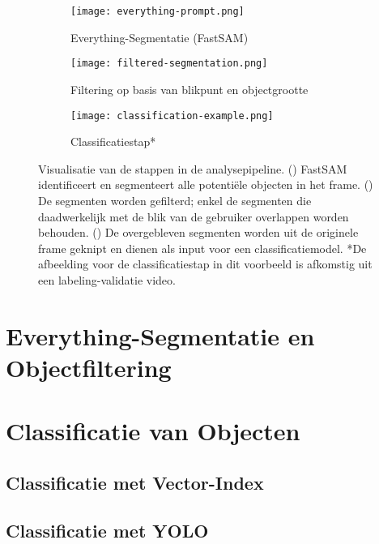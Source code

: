 \begin{figure}[H]
    \centering
        \begin{subfigure}[b]{0.75\textwidth}
        \centering
        \texttt{[image: everything-prompt.png]}
        \caption{Everything-Segmentatie (FastSAM)}
        \label{fig:pipeline_stap_a}
    \end{subfigure}

    \vspace{0.5cm}

    \begin{subfigure}[b]{0.75\textwidth}
    \centering
    \texttt{[image: filtered-segmentation.png]}
    \caption{Filtering op basis van blikpunt en objectgrootte}
    \label{fig:pipeline_stap_b}
    \end{subfigure}

    \vspace{0.5cm}

    \begin{subfigure}[b]{0.75\textwidth}
        \centering
        \texttt{[image: classification-example.png]}
        \caption{Classificatiestap*}
        \label{fig:pipeline_stap_c}
    \end{subfigure}
    \caption[Visualisatie van de Analysepipeline]{
        \label{fig:analyse-pipeline-visualisatie}
        Visualisatie van de stappen in de analysepipeline.
        () FastSAM identificeert en segmenteert alle potentiële objecten in het frame.
        () De segmenten worden gefilterd; enkel de segmenten die daadwerkelijk met de blik van de gebruiker overlappen worden behouden.
        () De overgebleven segmenten worden uit de originele frame geknipt en dienen als input voor een classificatiemodel.
        *De afbeelding voor de classificatiestap in dit voorbeeld is afkomstig uit een labeling-validatie video.
    }
\end{figure}

\section{Everything-Segmentatie en Objectfiltering}

\section{Classificatie van Objecten}

\subsection{Classificatie met Vector-Index}

\subsection{Classificatie met YOLO}

